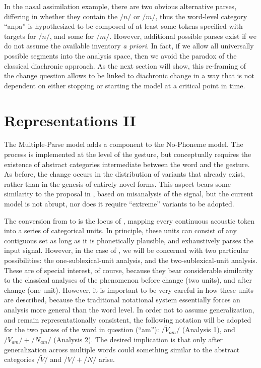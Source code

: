 In the nasal assimilation example, there are two obvious alternative
parses, differing in whether they contain the  $/n/$ or $/m/$,
thus the word-level category “anpa” is hypothesized to be composed
of at least some tokens specified with  targets for $/n/$,
and some for $/m/$. However, additional possible parses exist if
we do not assume the available  inventory \emph{a priori}.
In fact, if we allow all universally possible segments into the analysis
space, then we avoid the  paradox of the classical diachronic
approach. As the next section will show, this re-framing of the change
question allows  to be linked to diachronic change
in a way that is not dependent on either stopping or starting the
model at a critical point in time. 

\section{Representations II}

The Multiple-Parse model adds a  component to the No-Phoneme
model. The process is implemented at the level of the 
gesture, but conceptually requires the existence of abstract categories
intermediate between the word and the gesture. As before, the change
occurs in the distribution of variants that already exist, rather
than in the genesis of entirely novel forms. This aspect bears some
similarity to the proposal in \citet{Baker2011}, based on misanalysis
of the signal, but the current model is not abrupt, nor does it require
“extreme” variants to be adopted.

The conversion from  to  is the locus of 
, mapping every continuous acoustic token into a series of
categorical units. In principle, these units can consist of any contiguous
set as long as it is phonetically plausible, and exhaustively parses
the input signal. However, in the case of , we will
be concerned with two particular possibilities: the one-sublexical-unit
analysis, and the two-sublexical-unit analysis. These are of special
interest, of course, because they bear considerable similarity to
the classical analyses of the phenomenon before change (two units),
and after change (one unit). However, it is important to be very careful
in how these units are described, because the traditional notational
system essentially forces an analysis more general than the
word level. In order not to assume generalization, and remain representationally
consistent, the following notation will be adopted for the two 
parses of the word in question (“am”): $/\tilde{V}_{am}/$ (Analysis
1), and $/V_{am}/+/N_{am}/$ (Analysis 2). The desired implication
is that only after generalization across multiple words could something
similar to the abstract categories $/\widetilde{V}/$ and $/V/+/N/$
arise.

